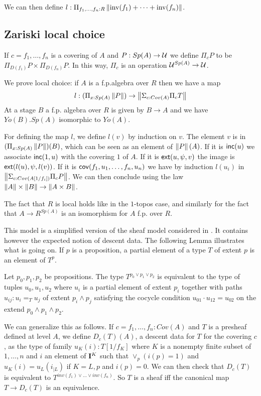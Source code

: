We can then define $l:\Pi_{f_1,\dots,f_n:R}\left\lVert \mathrm{inv}(f_1)+\dots+\mathrm{inv}(f_n) \right\rVert$.

\subsection{Zariski local choice}

If $c = f_1,\dots,f_n$ is a covering of $A$ and $P:Sp(A)\rightarrow \mathcal{U}$ we define
$\Pi_c P$ to be $\Pi_{D(f_1)}P\times\Pi_{D(f_n)}P$. In this way, $\Pi_c$ is an operation
$\mathcal{U}^{Sp(A)}\rightarrow\mathcal{U}$.

We prove local choice: if $A$ is a f.p.\@ algebra over $R$ then we have a map
$$
l:(\Pi_{x:Sp(A)}\left\lVert P \right\rVert)\rightarrow \left\lVert \Sigma_{c:Cov(A)}\Pi_cT \right\rVert
$$
At a stage $B$ a f.p. algebra over $R$ is given by $B\rightarrow A$ and we have $Yo(B).Sp(A)$ isomorphic
to $Yo(A)$.

For defining the map $l$, we define $l(v)$ by induction on $v$.
The element $v$ is in $(\Pi_{x:Sp(A)}\left\lVert P \right\rVert)(B)$, which can be seen as
an element of $\left\lVert P \right\rVert(A)$. If it is $\mathsf{inc}(u)$ we associate $\mathsf{inc}(1,u)$ with the covering $1$ of $A$.
If it is $\mathsf{ext}(u,\psi,v)$ the image is $\mathsf{ext}(l(u),\psi,l(v))$.
If it is $\mathsf{cov}(f_1,u_1,\dots,f_n,u_n)$ we have by induction $l(u_i)$ in $\left\lVert \Sigma_{c:Cov(A[1/f_i])}\Pi_c P \right\rVert$.
We can then conclude using the law $\left\lVert A \right\rVert\times \left\lVert B \right\rVert\rightarrow\left\lVert A\times B \right\rVert$.

\medskip

The fact that $R$ is local holds like in the $1$-topos case, and similarly for the fact that
$A\rightarrow R^{Sp(A)}$ is an isomorphism for $A$ f.p. over $R$.

\medskip

 This model is a  simplified version of the sheaf model considered in \cite{CRS21}. It contains however the expected notion
of descent data. The following Lemma illustrates what is going on. If $p$ is a proposition, a partial element of a type $T$ of
extent $p$ is an element of $T^p$.

\begin{lemma}
  Let $p_0,p_1,p_2$ be propositions. The type $T^{p_0\vee p_1\vee p_2}$ is equivalent to the type of tuples $u_0,u_1,u_2$
  where $u_i$ is a partial element of extent $p_i$ together with paths $u_{ij}:u_i =_T u_j$ of extent $p_i\wedge p_j$
  satisfying the cocycle condition $u_{01}\cdot u_{12} = u_{02}$ on the extend $p_0\wedge p_1\wedge p_2$.
\end{lemma}

We can generalize this as follows. If $c = f_1,\dots,f_n:Cov(A)$  and $T$ is a presheaf defined at level $A$, we define
$D_c(T)(A)$, a descent data for $T$ for the covering $c$, as the type of family $u_K(i):T[1/f_K]$ where $K$ is a nonempty
finite subset of $1,\dots,n$ and $i$ an element of $\mathbf{I}^K$ such that $\vee_p (i(p) = 1)$ and $u_K(i) = u_L(i_{|L})$
if $K = L,p$ and $i(p) = 0$. We can then check that $D_c(T)$ is equivalent to $T^{inv(f_1)\vee\dots\vee inv(f_n)}$.
So $T$ is a sheaf iff the canonical map $T\rightarrow D_c(T)$ is an equivalence.


